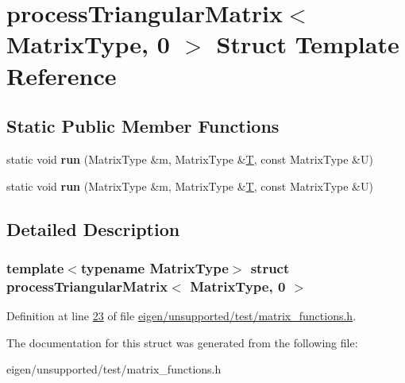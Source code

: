 \hypertarget{structprocess_triangular_matrix_3_01_matrix_type_00_010_01_4}{}\section{process\+Triangular\+Matrix$<$ Matrix\+Type, 0 $>$ Struct Template Reference}
\label{structprocess_triangular_matrix_3_01_matrix_type_00_010_01_4}
\subsection*{Static Public Member Functions}
\begin{DoxyCompactItemize}
\item 
\mbox{\label{structprocess_triangular_matrix_3_01_matrix_type_00_010_01_4_a1702a024db08d00c0333f30052c52371}} 
static void {\bfseries run} (Matrix\+Type \&m, Matrix\+Type \&\hyperlink{group___sparse_core___module}{T}, const Matrix\+Type \&U)
\item 
\mbox{\label{structprocess_triangular_matrix_3_01_matrix_type_00_010_01_4_a1702a024db08d00c0333f30052c52371}} 
static void {\bfseries run} (Matrix\+Type \&m, Matrix\+Type \&\hyperlink{group___sparse_core___module}{T}, const Matrix\+Type \&U)
\end{DoxyCompactItemize}


\subsection{Detailed Description}
\subsubsection*{template$<$typename Matrix\+Type$>$\newline
struct process\+Triangular\+Matrix$<$ Matrix\+Type, 0 $>$}



Definition at line \hyperlink{eigen_2unsupported_2test_2matrix__functions_8h_source_l00023}{23} of file \hyperlink{eigen_2unsupported_2test_2matrix__functions_8h_source}{eigen/unsupported/test/matrix\+\_\+functions.\+h}.



The documentation for this struct was generated from the following file\+:\begin{DoxyCompactItemize}
\item 
eigen/unsupported/test/matrix\+\_\+functions.\+h\end{DoxyCompactItemize}
